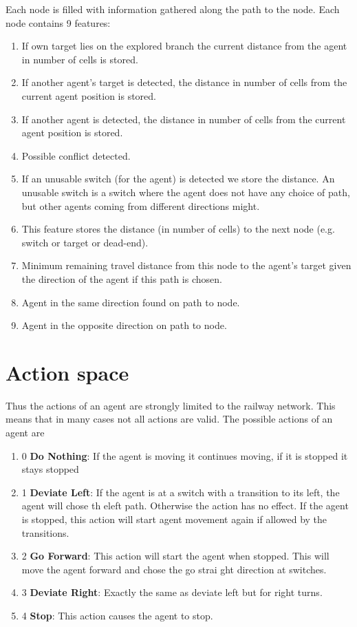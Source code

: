 Each node is filled with information gathered along the path to the node. 
Each node contains 9 features:

\begin {enumerate}
\item If own target lies on the explored branch the current distance from the agent in number of cells is stored.
\item If another agent’s target is detected, the distance in number of cells from the current agent position is stored.
\item If another agent is detected, the distance in number of cells from the current agent position is stored.
\item Possible conflict detected.
\item If an unusable switch (for the agent) is detected we store the distance. An unusable switch is a switch where the agent does not 
have any choice of path, but other agents coming from different directions might.
\item This feature stores the distance (in number of cells) to the next node (e.g. switch or target or dead-end).
\item Minimum remaining travel distance from this node to the agent’s target given the direction of the agent if this path is chosen.
\item Agent in the same direction found on path to node.
\item Agent in the opposite direction on path to node.
\end{enumerate}

\section {Action space}
Thus the actions\cite{WEBSITE:8} of an agent are strongly limited to the railway network. 
This means that in many cases not all actions are valid. The possible actions of an agent are
\begin{enumerate}
    \item 0 \textbf{Do Nothing}: If the agent is moving it continues moving, if it is stopped it stays stopped
    \item 1 \textbf{Deviate Left}: If the agent is at a switch with a transition to its left, 
        the agent will chose th eleft path. Otherwise the action has no effect. 
        If the agent is stopped, this action will start agent movement again if allowed by the 
        transitions.
    \item 2 \textbf{Go Forward}: This action will start the agent when stopped. 
    This will move the agent forward and chose the go strai
    ght direction at switches.
    \item 3 \textbf{Deviate Right}: Exactly the same as deviate left but for right turns.
    \item 4 \textbf{Stop}: This action causes the agent to stop.
\end{enumerate}

